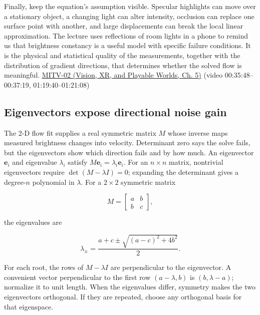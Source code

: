 Finally, keep the equation's assumption visible. Specular highlights can move over a stationary object, a changing light can alter intensity, occlusion can replace one surface point with another, and large displacements can break the local linear approximation. The lecture uses reflections of room lights in a phone to remind us that brightness constancy is a useful model with specific failure conditions. It is the physical and statistical quality of the measurements, together with the distribution of gradient directions, that determines whether the solved flow is meaningful. \href{../07-Vision-XR-and-Playable-Worlds/main.pdf\#nameddest=04-visual-computing-ii-ch036-mitv-02---image-formation-perspective-projection-time-derivative-motion-field}{MITV-02 (Vision, XR, and Playable Worlds, Ch. 5)} (video 00:35:48--00:37:19, 01:19:40--01:21:08)

\subsection{Eigenvectors expose directional noise gain}\label{04-visual-computing-ii-ch030-eigenvectors-expose-directional-noise-gain}

\hypertarget{04-visual-computing-ii-ch030-eigenvectors-expose-directional-noise-gain}{}

The 2-D flow fit supplies a real symmetric matrix \(M\) whose inverse maps measured brightness changes into velocity. Determinant zero says the solve fails, but the eigenvectors show which direction fails and by how much. An eigenvector \(\mathbf e_i\) and eigenvalue \(\lambda_i\) satisfy \(M\mathbf e_i=\lambda_i\mathbf e_i\). For an \(n\times n\) matrix, nontrivial eigenvectors require \(\det(M-\lambda I)=0\); expanding the determinant gives a degree-\(n\) polynomial in \(\lambda\). For a \(2\times2\) symmetric matrix

\[
M=\begin{bmatrix}a&b\\b&c\end{bmatrix},
\]

the eigenvalues are

\[
\lambda_{\pm}=\frac{a+c\pm\sqrt{(a-c)^2+4b^2}}{2}.
\]

For each root, the rows of \(M-\lambda I\) are perpendicular to the eigenvector. A convenient vector perpendicular to the first row \((a-\lambda,b)\) is \((b,\lambda-a)\); normalize it to unit length. When the eigenvalues differ, symmetry makes the two eigenvectors orthogonal. If they are repeated, choose any orthogonal basis for that eigenspace.

